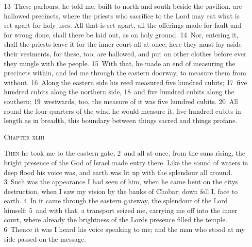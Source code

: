 \documentclass[10pt]{book} %
\begin{document}
\textcolor{benred8}{13}~These parlours, he told me, built to north and south beside the pavilion, are hallowed precincts, where the priests who sacrifice to the Lord may eat what is set apart for holy uses. All that is set apart, all the offerings made for fault and for wrong done, shall there be laid out, as on holy ground. \textcolor{benred8}{14}~Nor, entering it, shall the priests leave it for the inner court all at once; here they must lay aside their vestments, for these, too, are hallowed, and put on other clothes before ever they mingle with the people.
\textcolor{benred8}{15}~With that, he made an end of measuring the precincts within, and led me through the eastern doorway, to measure them from without. \textcolor{benred8}{16}~Along the eastern side his reed measured five hundred cubits; \textcolor{benred8}{17}~five hundred cubits along the northern side, \textcolor{benred8}{18}~and five hundred cubits along the southern; \textcolor{benred8}{19}~westwards, too, the measure of it was five hundred cubits. \textcolor{benred8}{20}~All round the four quarters of the wind he would measure it, five hundred cubits in length as in breadth, this boundary between things sacred and things profane.
\begin{large}\begin{center}\textsc{Chapter xliii}\end{center}\end{large}
\lettrine[lines=2]{T}{hen} he took me to the eastern gate; \textcolor{benred8}{2}~and all at once, from the sun\textquotesingle s rising, the bright presence of the God of Israel made entry there. Like the sound of waters in deep flood his voice was, and earth was lit up with the splendour all around. \textcolor{benred8}{3}~Such was the appearance I had seen of him, when he came bent on the city\textquotesingle s destruction, when I saw my vision by the banks of Chobar; down fell I, face to earth. \textcolor{benred8}{4}~In it came through the eastern gateway, the splendour of the Lord himself; \textcolor{benred8}{5}~and with that, a transport seized me, carrying me off into the inner court, where already the brightness of the Lord\textquotesingle s presence filled the temple. \textcolor{benred8}{6}~Thence it was I heard his voice speaking to me; and the man who stood at my side passed on the message.
\end{document}
